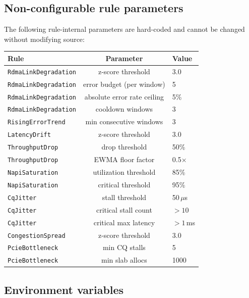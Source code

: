 \documentclass[11pt]{article}
\begin{document}
\subsection{Non-configurable rule parameters}

The following rule-internal parameters are hard-coded and cannot be changed
without modifying source:

\begin{center}
\small
\begin{tabular}{lcp{5.5cm}}
\toprule
Rule & Parameter & Value \\
\midrule
\texttt{RdmaLinkDegradation} & z-score threshold & 3.0 \\
\texttt{RdmaLinkDegradation} & error budget (per window) & 5 \\
\texttt{RdmaLinkDegradation} & absolute error rate ceiling & 5\% \\
\texttt{RdmaLinkDegradation} & cooldown windows & 3 \\
\texttt{RisingErrorTrend}    & min consecutive windows & 3 \\
\texttt{LatencyDrift}        & z-score threshold & 3.0 \\
\texttt{ThroughputDrop}      & drop threshold & 50\% \\
\texttt{ThroughputDrop}      & EWMA floor factor & 0.5$\times$ \\
\texttt{NapiSaturation}      & utilization threshold & 85\% \\
\texttt{NapiSaturation}      & critical threshold & 95\% \\
\texttt{CqJitter}            & stall threshold & 50\,$\mu$s \\
\texttt{CqJitter}            & critical stall count & $>10$ \\
\texttt{CqJitter}            & critical max latency & $>1$\,ms \\
\texttt{CongestionSpread}    & z-score threshold & 3.0 \\
\texttt{PcieBottleneck}      & min CQ stalls & 5 \\
\texttt{PcieBottleneck}      & min slab allocs & 1000 \\
\bottomrule
\end{tabular}
\end{center}

\subsection{Environment variables}
\end{document}
